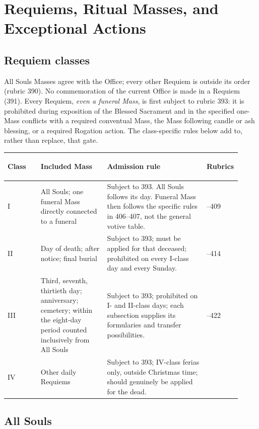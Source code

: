 \section{Requiems, Ritual Masses, and Exceptional Actions}
\label{sec:requiem}

\subsection{Requiem classes}

All Souls Masses agree with the Office; every other Requiem is outside its order (rubric 390). No commemoration of the current Office is made in a Requiem (391). Every Requiem, \emph{even a funeral Mass}, is first subject to rubric 393: it is prohibited during exposition of the Blessed Sacrament and in the specified one-Mass conflicts with a required conventual Mass, the Mass following candle or ash blessing, or a required Rogation action. The class-specific rules below add to, rather than replace, that gate.

\begin{longtable}{>{\bfseries\raggedright\arraybackslash}p{0.14\linewidth}>{\raggedright\arraybackslash}p{0.28\linewidth}>{\raggedright\arraybackslash}p{0.42\linewidth}>{\raggedright\arraybackslash}p{0.08\linewidth}}
\toprule
Class & Included Mass & Admission rule & Rubrics\\
\midrule
\endhead
I & All Souls; one funeral Mass directly connected to a funeral & Subject to 393. All Souls follows its day. Funeral Mass then follows the specific rules in 406--407, not the general votive table. & 402--409\\
II & Day of death; after notice; final burial & Subject to 393; must be applied for that deceased; prohibited on every I-class day and every Sunday. & 410--414\\
III & Third, seventh, thirtieth day; anniversary; cemetery; within the eight-day period counted inclusively from All Souls & Subject to 393; prohibited on I- and II-class days; each subsection supplies its formularies and transfer possibilities. & 415--422\\
IV & Other daily Requiems & Subject to 393; IV-class ferias only, outside Christmas time; should genuinely be applied for the dead. & 423\\
\bottomrule
\end{longtable}

\subsection{All Souls}

